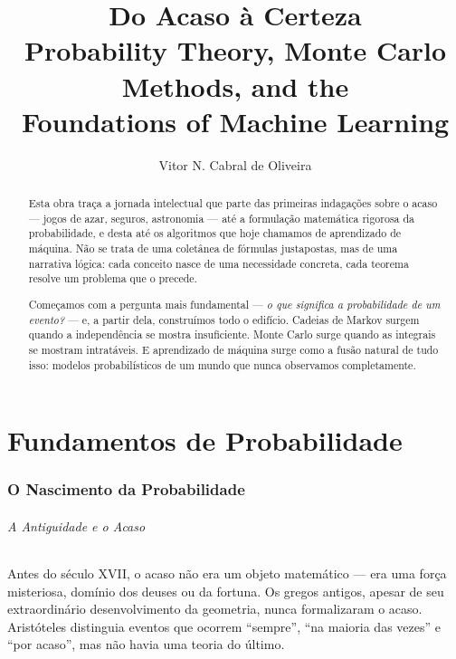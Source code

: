 \documentclass{tufte-handout}
\title{Do Acaso à Certeza\\ \large Probability Theory, Monte Carlo Methods, and the\\ Foundations of Machine Learning}
\author{Vitor N. Cabral de Oliveira}
\begin{document}
\maketitle

\begin{abstract}
    Esta obra traça a jornada intelectual que parte das primeiras indagações sobre o acaso ---
    jogos de azar, seguros, astronomia --- até a formulação matemática rigorosa da probabilidade,
    e desta até os algoritmos que hoje chamamos de aprendizado de máquina. Não se trata de uma
    coletânea de fórmulas justapostas, mas de uma narrativa lógica: cada conceito nasce de uma
    necessidade concreta, cada teorema resolve um problema que o precede.

    Começamos com a pergunta mais fundamental --- \textit{o que significa a probabilidade de um
    evento?} --- e, a partir dela, construímos todo o edifício. Cadeias de Markov surgem quando
    a independência se mostra insuficiente. Monte Carlo surge quando as integrais se mostram
    intratáveis. E aprendizado de máquina surge como a fusão natural de tudo isso: modelos
    probabilísticos de um mundo que nunca observamos completamente.
\end{abstract}

\newpage
\hypersetup{linkcolor=wp-text}
\tableofcontents
\hypersetup{linkcolor=wp-primary}

\newpage


\part{Fundamentos de Probabilidade}

\section{O Nascimento da Probabilidade}

\paragraph{A Antiguidade e o Acaso}

Antes do século XVII, o acaso não era um objeto matemático --- era uma força misteriosa,
domínio dos deuses ou da fortuna. Os gregos antigos, apesar de seu extraordinário desenvolvimento
da geometria, nunca formalizaram o acaso. Aristóteles distinguia eventos que ocorrem
``sempre'', ``na maioria das vezes'' e ``por acaso'', mas não havia uma teoria do último.
\end{document}
